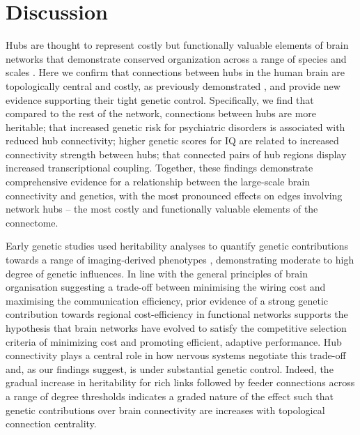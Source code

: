 \section{Discussion}

Hubs are thought to represent costly but functionally valuable elements of brain networks \citep{VandenHeuvel2012} that demonstrate conserved organization across a range of species and scales \citep{Harriger2012,Towlson2013,VandenHeuvel2011,Zamora-Lopez2010}. Here we confirm that connections between hubs in the human brain are topologically central and costly, as previously demonstrated \citep{VandenHeuvel2012}, and provide new evidence supporting their tight genetic control. Specifically, we find that compared to the rest of the network, connections between hubs are more heritable; that increased genetic risk for psychiatric disorders is associated with reduced hub connectivity; higher genetic scores for IQ are related to increased connectivity strength between hubs; that connected pairs of hub regions display increased transcriptional coupling. Together, these findings demonstrate comprehensive evidence for a relationship between the large-scale brain connectivity and genetics, with the most pronounced effects on edges involving network hubs -- the most costly and functionally valuable elements of the connectome.

Early genetic studies used heritability analyses to quantify genetic contributions towards a range of imaging-derived phenotypes \citep{Colclough2017,Fornito2011,Peper2007,Roshchupkin2016,Shen2014,Sinclair2015,Sudre2017,Thompson2001}, demonstrating moderate to high degree of genetic influences. In line with the general principles of brain organisation suggesting a trade-off between minimising the wiring cost and maximising the communication efficiency, prior evidence of a strong genetic contribution towards regional cost-efficiency in functional networks \citep{Fornito2011} supports the hypothesis that brain networks have evolved to satisfy the competitive selection criteria of minimizing cost and promoting efficient, adaptive performance. Hub connectivity plays a central role in how nervous systems negotiate this trade-off \citep{VandenHeuvel2013b}  and, as our findings suggest, is under substantial genetic control. Indeed, the gradual increase in heritability for rich links followed by feeder connections across a range of degree thresholds indicates a graded nature of the effect such that genetic contributions over brain connectivity are increases with topological connection centrality.

